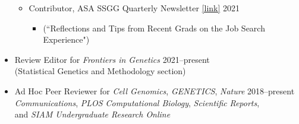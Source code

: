 \documentclass[margin]{res}
\begin{document}
\begin{resume}
\begin{itemize}
\begin{itemize}
		\item Contributor, ASA SSGG Quarterly Newsletter \href{https://higherlogicdownload.s3.amazonaws.com/AMSTAT/6d11267c-5862-4c31-9f1e-f5a52a11ea5f/UploadedImages/Newsletters/Newsletter_SSGG_2021Sept_final.pdf}{[link]} \hfill 2021
			\begin{itemize}[leftmargin=-0in] \vspace{-0.2cm}
			\item[]  \begin{footnotesize}(``Reflections and Tips from Recent Grads on the Job Search Experience") \end{footnotesize}
			\end{itemize} %
		
		\end{itemize}
		
	\item Review Editor for \textit{Frontiers in Genetics}   \hfill 2021--present \\ (Statistical Genetics and Methodology section)
	
	\item Ad Hoc Peer Reviewer for \textit{Cell Genomics}, \textit{GENETICS},  \textit{Nature }  \hfill 2018--present \\ \textit{Communications}, \textit{PLOS Computational Biology},  \textit{Scientific} \textit{Reports}, \\ and \textit{SIAM Undergraduate Research Online} 
	\end{itemize}
	

\end{resume}
\end{document}
